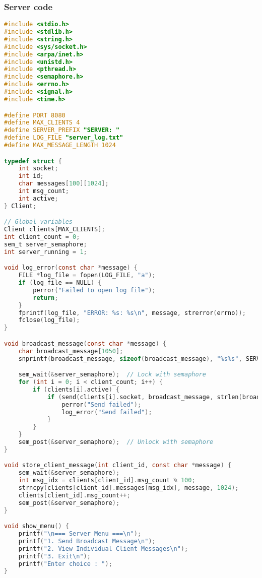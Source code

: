 \documentclass{article}
\begin{document}
\subsubsection*{Server code}
\begin{lstlisting}[language=C, caption= server code - Socket Programming Code]
#include <stdio.h>
#include <stdlib.h>
#include <string.h>
#include <sys/socket.h>
#include <arpa/inet.h>
#include <unistd.h>
#include <pthread.h>
#include <semaphore.h>
#include <errno.h>
#include <signal.h>
#include <time.h>

#define PORT 8080
#define MAX_CLIENTS 4
#define SERVER_PREFIX "SERVER: "
#define LOG_FILE "server_log.txt"
#define MAX_MESSAGE_LENGTH 1024

typedef struct {
    int socket;
    int id;
    char messages[100][1024];
    int msg_count;
    int active;
} Client;

// Global variables
Client clients[MAX_CLIENTS];
int client_count = 0;
sem_t server_semaphore;  
int server_running = 1;

void log_error(const char *message) {
    FILE *log_file = fopen(LOG_FILE, "a");
    if (log_file == NULL) {
        perror("Failed to open log file");
        return;
    }
    fprintf(log_file, "ERROR: %s: %s\n", message, strerror(errno));
    fclose(log_file);
}

void broadcast_message(const char *message) {
    char broadcast_message[1050];
    snprintf(broadcast_message, sizeof(broadcast_message), "%s%s", SERVER_PREFIX, message);

    sem_wait(&server_semaphore);  // Lock with semaphore
    for (int i = 0; i < client_count; i++) {
        if (clients[i].active) {
            if (send(clients[i].socket, broadcast_message, strlen(broadcast_message), 0) < 0) {
                perror("Send failed");
                log_error("Send failed");
            }
        }
    }
    sem_post(&server_semaphore);  // Unlock with semaphore
}

void store_client_message(int client_id, const char *message) {
    sem_wait(&server_semaphore);
    int msg_idx = clients[client_id].msg_count % 100;
    strncpy(clients[client_id].messages[msg_idx], message, 1024);
    clients[client_id].msg_count++;
    sem_post(&server_semaphore);
}

void show_menu() {
    printf("\n=== Server Menu ===\n");
    printf("1. Send Broadcast Message\n");
    printf("2. View Individual Client Messages\n");
    printf("3. Exit\n");
    printf("Enter choice : ");
}


\end{lstlisting}
\end{document}

